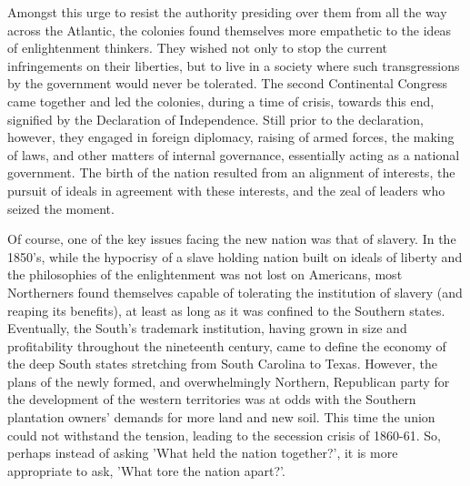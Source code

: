 \documentclass[a4paper]{article}
\begin{document}
Amongst this urge to resist the authority presiding over them from all the way across the Atlantic, the colonies found themselves more empathetic to the ideas of enlightenment thinkers. They wished not only to stop the current infringements on their liberties, but to live in a society where such transgressions by the government would never be tolerated. The second Continental Congress came together and led the colonies, during a time of crisis, towards this end, signified by the Declaration of Independence. Still prior to the declaration, however, they engaged in foreign diplomacy, raising of armed forces, the making of laws, and other matters of internal governance, essentially acting as a national government. \autocite[pp. 176]{AmericanRep1} The birth of the nation resulted from an alignment of interests, the pursuit of ideals in agreement with these interests, and the zeal of leaders who seized the moment. 

Of course, one of the key issues facing the new nation was that of slavery. In the 1850’s, while the hypocrisy of a slave holding nation built on ideals of liberty and the philosophies of the enlightenment was not lost on Americans, most Northerners found themselves capable of tolerating the institution of slavery (and reaping its benefits), at least as long as it was confined to the Southern states. Eventually, the South’s trademark institution, having grown in size and profitability throughout the nineteenth century, came to define the economy of the deep South states stretching from South Carolina to Texas. However, the plans of the newly formed, and overwhelmingly Northern, Republican party for the development of the western territories was at odds with the Southern plantation owners’ demands for more land and new soil. \autocite{EconomicOrig} This time the union could not withstand the tension, leading to the secession crisis of 1860-61. So, perhaps instead of asking 'What held the nation together?’, it is more appropriate to ask, 'What tore the nation apart?’.  
\end{document}
